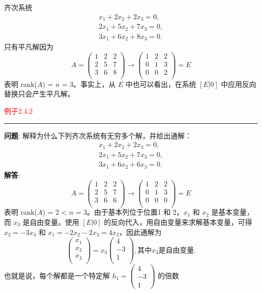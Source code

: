 齐次系统
\[
\begin{align} 
    x_1 + 2x_2 + 2x_3 = 0, \\
    2x_1 + 5x_2 + 7x_3 = 0, \\
    3x_1 + 6x_2 + 8x_3 = 0.
\end{align}
\]
只有平凡解因为
\[
A = 
\left(\begin{array}{ccc}
    1 & 2 & 2 \\
    2 & 5 & 7 \\
    3 & 6 & 8 \\
\end{array}\right)\to
\left(\begin{array}{cccc}
    1 & 2 & 2 \\
    0 & 1 & 3 \\
    0 & 0 & 2 \\
\end{array}\right) = E
\]
表明 rank(\(A\)) = \(n\) = 3。事实上，从 \(E\) 中也可以看出，在系统 \([E|0]\) 中应用反向替换只会产生平凡解。

\textcolor{red}{例子2.4.2}
\color{red}\rule{\textwidth}{0.4pt}\color{black}

\textbf{问题}: 解释为什么下列齐次系统有无穷多个解，并给出通解：
\[
\begin{align} 
    x_1 + 2x_2 + 2x_3 = 0, \\
    2x_1 + 5x_2 + 7x_3 = 0, \\
    3x_1 + 6x_2 + 6x_3 = 0.
\end{align}
\]
\textbf{解答}: 
\[
A = 
\left(\begin{array}{ccc}
    1 & 2 & 2 \\
    2 & 5 & 7 \\
    3 & 6 & 6 \\
\end{array}\right)\to
\left(\begin{array}{cccc}
    1 & 2 & 2 \\
    0 & 1 & 3 \\
    0 & 0 & 0 \\
\end{array}\right) = E
\]
表明 rank(\(A\)) = 2 < \(n\) = 3。由于基本列位于位置1 和 2，\(x_1\) 和 \(x_2\) 是基本变量，而 \(x_3\) 是自由变量。使用
\([E|0]\) 的反向代入，用自由变量来求解基本变量，可得 \(x_2 = -3x_3\) 和 \(x_1 = -2x_2 - 2x_3 = 4x_3\)，因此通解为
\[
\left(\begin{array}{c}
    x_1 \\
    x_2 \\
    x_3 \\
\end{array}\right) = x_3
\left(\begin{array}{c}
    4 \\
    -3 \\
    1 \\
\end{array}\right), \text{其中} x_3 \text{是自由变量}.
\]
也就是说，每个解都是一个特定解 \(h_1 = \left(\begin{array}{cols} 4 \\-3 \\1\end{array}\right)\) 的倍数

